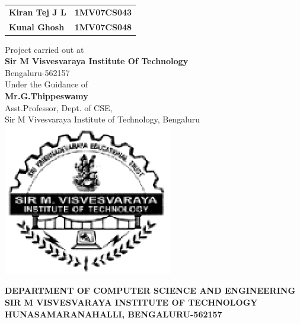 \documentclass{article}
[10pt,a4paper]
\newcommand{\tab}{\hspace*{8 cm}}
\begin{document}
\begin{center}
\begin{table}[h]
\begin{tabular}{lr}
\normalsize\textbf{Kiran Tej J L}  \tab & \textbf{1MV07CS043}  \\
\normalsize\textbf{Kunal Ghosh} \tab &  \textbf{1MV07CS048}   \\ 
\end{tabular}
\end{table}
\vspace{1mm}
\normalsize{Project carried out at} \\
\vspace{0.5mm}
\large\textbf{Sir M Visvesvaraya Institute Of Technology}\\
\vspace{0.5mm}
\normalsize{Bengaluru-562157}\\
\vspace{2mm}
\normalsize{Under the Guidance of\\}
\vspace{1mm}
\normalsize\textbf{Mr.G.Thippeswamy}\\
\vspace{0.5mm}
\small{Asst.Professor, Dept. of CSE,\\}
\vspace{0.5mm}
\normalsize{Sir M Vivesvaraya Institute of Technology, Bengaluru\\}
\vspace{1mm}
\includegraphics{mspicture1.eps}

\vspace{1mm}

\normalsize\textbf{DEPARTMENT OF COMPUTER SCIENCE AND ENGINEERING}\\
\vspace{1mm}
\normalsize\textbf{SIR M VISVESVARAYA INSTITUTE OF TECHNOLOGY}\\
\vspace{1mm}
\small\textbf{HUNASAMARANAHALLI, BENGALURU-562157}\\

\end{center}
\end{document}
